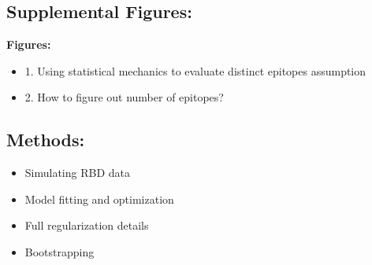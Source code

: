 \documentclass{article}
\newcommand{\beginsupplement}{%
        \setcounter{table}{0}
        \renewcommand{\thetable}{S\arabic{table}}%
        \setcounter{figure}{0}
        \renewcommand{\thefigure}{S\arabic{figure}}%
     }
\begin{document}
\subsection*{Supplemental Figures:}
\textbf{Figures:}
\begin{itemize}
	\item 1. Using statistical mechanics to evaluate distinct epitopes assumption
	\item 2. How to figure out number of epitopes?
\end{itemize}

\subsection*{Methods:}
\begin{itemize}
	\item Simulating RBD data
	\item Model fitting and optimization
	\item Full regularization details
	\item Bootstrapping
\end{itemize}







\end{document}
